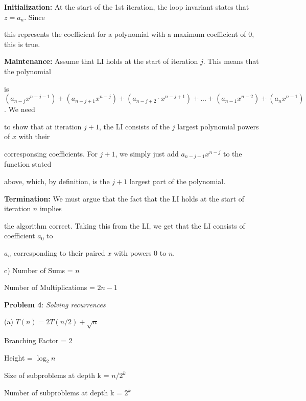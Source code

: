 \documentclass{article} %
\newcommand{\question}[2][]{\begin{flushleft}
        \textbf{Problem #1}: \textit{#2}

\end{flushleft}}
\begin{document}
    \textbf{Initialization:} At the start of the 1st iteration, the loop invariant states that $z = a_n$. Since 
    
    this represents the coefficient for a polynomial with a maximum coefficient of 0, this is true.

    \vspace{5pt}

    \textbf{Maintenance:} Assume that LI holds at the start of iteration $j$. This means that the polynomial 
    
    is $(a_{n - j} x^{n - j - 1}) + (a_{n - j + 1} x ^ {n - j}) + (a_{n - j + 2} \cdot x^{n - j + 1}) + ... + (a_{n - 1}x^{n - 2}) + (a_nx^{n - 1})$. We need 
    
    to show that at iteration $j + 1$, the LI consists of the $j$ largest polynomial powers of $x$ with their 
    
    corresponsing coefficients. For $j + 1$, we simply just add $a_{n - j - 1} x^{n-j}$ to the function stated 
    
    above, which, by definition, is the $j + 1$ largest part of the polynomial.

    \vspace{5pt}

    \textbf{Termination:} We must argue that the fact that the LI holds at the start of iteration $n$ implies
    
    the algorithm correct. Taking this from the LI, we get that the LI consists of coefficient $a_0$ to 
    
    $a_n$ corresponding to their paired $x$ with powers 0 to $n$.

    \vspace{7pt}

    c) Number of Sums = $n$

    Number of Multiplications = $2n - 1$

    \newpage

    \question[4]{Solving recurrences}

    (a) $T(n) = 2T(n / 2) + \sqrt{n}$
    
    \hspace{13pt} Branching Factor = 2
    
    \hspace{13pt} Height = $\log_2n $

    \hspace{13pt} Size of subproblems at depth k = $n/2^k$

    \hspace{13pt} Number of subproblems at depth k = $2^k$
\end{document}
